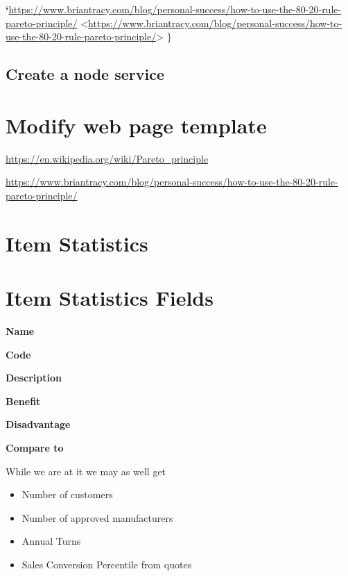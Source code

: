 \documentclass[letterpaper,10pt,english]{sphinxmanual}
\begin{document}
{\color{red}\bfseries{}{}`}\href{https://www.briantracy.com/blog/personal-success/how-to-use-the-80-20-rule-pareto-principle/}{https://www.briantracy.com/blog/personal-success/how-to-use-the-80-20-rule-pareto-principle/} \textless{}\href{https://www.briantracy.com/blog/personal-success/how-to-use-the-80-20-rule-pareto-principle/}{https://www.briantracy.com/blog/personal-success/how-to-use-the-80-20-rule-pareto-principle/}\textgreater{}
\}


\subsection{Create a node service}
\label{Portal/100-ABC:create-a-node-service}

\section{Modify web page template}
\label{Portal/100-ABC:modify-web-page-template}
\href{https://en.wikipedia.org/wiki/Pareto\_principle}{https://en.wikipedia.org/wiki/Pareto\_principle}

\href{https://www.briantracy.com/blog/personal-success/how-to-use-the-80-20-rule-pareto-principle/}{https://www.briantracy.com/blog/personal-success/how-to-use-the-80-20-rule-pareto-principle/}


\section{Item Statistics}
\label{Portal/100-ABC:id6}

\section{Item Statistics Fields}
\label{Portal/100-ABC:item-statistics-fields}
\textbf{Name}

\textbf{Code}

\textbf{Description}

\textbf{Benefit}

\textbf{Disadvantage}

\textbf{Compare to}

While we are at it we may as well get
\begin{itemize}
\item {} 
Number of customers

\item {} 
Number of approved manufacturers

\item {} 
Annual Turns

\item {} 
Sales Conversion Percentile from quotes

\end{itemize}
\end{document}
